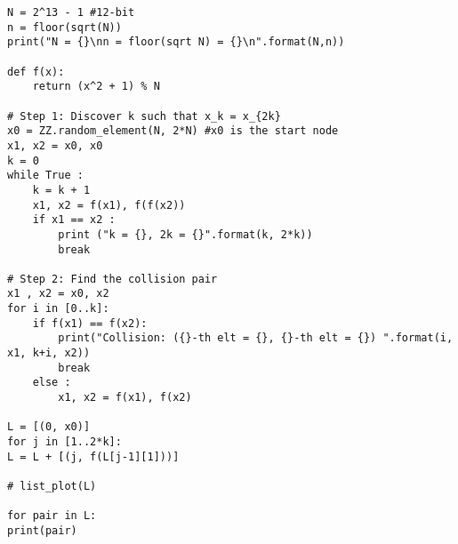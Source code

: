 \documentclass[12pt,openany]{book}
\theoremstyle{definition}
\begin{document}
\newpage
	\begin{lstlisting}[style=sage, caption={Small-Sapce Attack (Sage)},captionpos=t]
N = 2^13 - 1 #12-bit
n = floor(sqrt(N))
print("N = {}\nn = floor(sqrt N) = {}\n".format(N,n))

def f(x):
	return (x^2 + 1) % N

# Step 1: Discover k such that x_k = x_{2k}
x0 = ZZ.random_element(N, 2*N) #x0 is the start node
x1, x2 = x0, x0
k = 0
while True :
	k = k + 1
	x1, x2 = f(x1), f(f(x2))
	if x1 == x2 :
		print ("k = {}, 2k = {}".format(k, 2*k))
		break

# Step 2: Find the collision pair
x1 , x2 = x0, x2
for i in [0..k]:
	if f(x1) == f(x2):
		print("Collision: ({}-th elt = {}, {}-th elt = {}) ".format(i, x1, k+i, x2))
		break
	else :
		x1, x2 = f(x1), f(x2)

L = [(0, x0)]
for j in [1..2*k]:
L = L + [(j, f(L[j-1][1]))]

# list_plot(L)

for pair in L:
print(pair)
	\end{lstlisting}
	\iffalse
	\newpage
\end{document}
